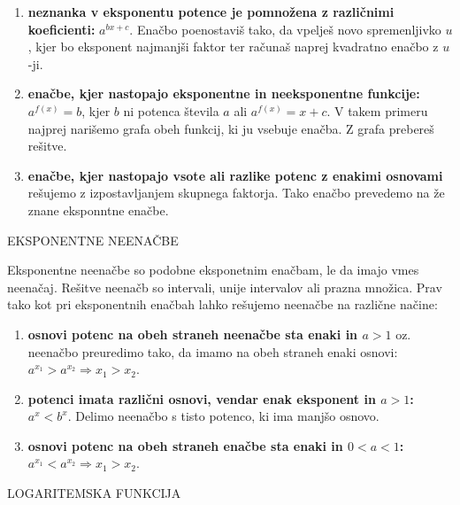 \begin{enumerate}
\item \textbf{neznanka v eksponentu potence je pomnožena z različnimi koeficienti:} $a^{bx + c}$. Enačbo poenostaviš tako, da vpelješ novo spremenljivko $u$, kjer bo eksponent najmanjši faktor ter računaš naprej kvadratno enačbo z $u$-ji.
\item \textbf{enačbe, kjer nastopajo eksponentne in neeksponentne funkcije:} $a^{f(x)} = b$, kjer $b$ ni potenca števila $a$ ali $a^{f(x)} = x + c$. V takem primeru najprej narišemo grafa obeh funkcij, ki ju vsebuje enačba. Z grafa prebereš rešitve. 
\item \textbf{enačbe, kjer nastopajo vsote ali razlike potenc z enakimi osnovami} rešujemo  z izpostavljanjem skupnega faktorja. Tako enačbo prevedemo na že znane eksponntne enačbe.
\end{enumerate}

\begin{center}
EKSPONENTNE NEENAČBE
\end{center}
Eksponentne neenačbe so podobne eksponetnim enačbam, le da imajo vmes neenačaj. Rešitve neenačb so intervali, unije intervalov ali prazna množica. Prav tako kot pri eksponentnih enačbah lahko rešujemo neenačbe na različne načine:
%
\begin{enumerate}
\item \textbf{osnovi potenc na obeh straneh neenačbe sta enaki in $a>1$} oz. neenačbo preuredimo tako, da imamo na obeh straneh enaki osnovi: $a^{x_1} > a^{x_2} \Rightarrow x_1 > x_2$.
\item \textbf{potenci imata različni osnovi, vendar enak eksponent in $a>1$:} $a^x < b^x$. Delimo neenačbo s tisto potenco, ki ima manjšo osnovo.
\item \textbf{osnovi potenc na obeh straneh enačbe sta enaki in $0<a<1$:}
\\
$a^{x_1}<a^{x_2} \Rightarrow x_1 > x_2$.
\end{enumerate}

\begin{center}
LOGARITEMSKA FUNKCIJA
\end{center}

